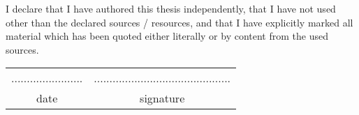 
%

\normalsize
I declare that I have authored this thesis independently, that I have not used other than the declared
sources / resources, and that I have explicitly marked all material which has been quoted either
literally or by content from the used sources.
\vspace*{3.0cm}

\begin{table}[H]
	\centering
	\begin{tabular}{ c c}
		.......................\hspace*{5.0cm}  & ............................................ \\
		date \hspace*{5.1cm} & signature \\
	\end{tabular}
\end{table}

